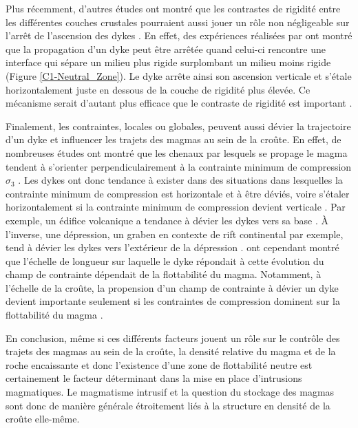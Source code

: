Plus récemment, d'autres études ont montré que les contrastes de
rigidité entre les différentes couches crustales pourraient aussi
jouer un rôle non négligeable sur l'arrêt de l'ascension des dykes
\citep{Menand:2011ki}. En effet, des expériences réalisées par
\citet{Kavanagh:2006ig} ont montré que la propagation d'un dyke peut
être arrêtée quand celui-ci rencontre une interface qui sépare un
milieu plus rigide surplombant un milieu moins rigide (Figure
\ref{C1-Neutral_Zone}). Le dyke arrête ainsi son ascension verticale
et s'étale horizontalement juste en dessous de la couche de rigidité
plus élevée. Ce mécanisme serait d'autant plus efficace que le
contraste de rigidité est important \citep{Kavanagh:2006ig}.

Finalement, les contraintes, locales ou globales, peuvent aussi dévier
la trajectoire d'un dyke et influencer les trajets des magmas au sein
de la croûte. En effet, de nombreuses études ont montré que les
chenaux par lesquels se propage le magma tendent à s'orienter
perpendiculairement à la contrainte minimum de compression $\sigma_3$
\citep{Anderson:L5JA3dNN,Watanabe:2002iw}. Les dykes ont donc tendance
à exister dans des situations dans lesquelles la contrainte minimum de
compression est horizontale et à être déviés, voire s'étaler
horizontalement si la contrainte minimum de compression devient
verticale \citep{Pinel:2000wa,Pinel:2004ji,Maccaferri:2014ft}. Par
exemple, un édifice volcanique a tendance à dévier les dykes vers sa
base \citep{Watanabe:2002iw,Dahm:2000jb,Maccaferri:2011bd}. À
l'inverse, une dépression, un graben en contexte de rift continental
par exemple, tend à dévier les dykes vers l'extérieur de la dépression
\citep{Maccaferri:2014ft}. \citet{Menand:2010uq} ont cependant montré
que l'échelle de longueur sur laquelle le dyke répondait à cette
évolution du champ de contrainte dépendait de la flottabilité du
magma. Notamment, à l'échelle de la croûte, la propension d'un champ
de contrainte à dévier un dyke devient importante seulement si les
contraintes de compression dominent sur la flottabilité du magma
\citep{Menand:2010uq}.

En conclusion, même si ces différents facteurs jouent un rôle sur le
contrôle des trajets des magmas au sein de la croûte, la densité
relative du magma et de la roche encaissante et donc l'existence d'une
zone de flottabilité neutre est certainement le facteur déterminant
dans la mise en place d'intrusions magmatiques. Le magmatisme
intrusif et la question du stockage des magmas sont donc de manière
générale étroitement liés à la structure en densité de la croûte
elle-même.



